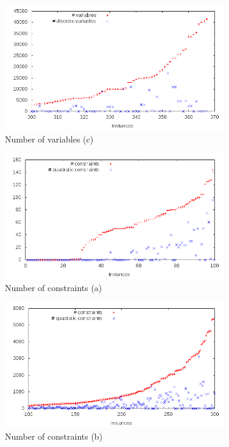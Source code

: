 \begin{enumerate}
\begin{figure}\centering
  \includegraphics[width=0.85\textwidth]{pic_var_big.png}
  \caption{Number of variables (c) \label{fig:pic_var_large}}
\end{figure}

\begin{figure}\centering
  \includegraphics[width=0.85\textwidth]{pic_constr_small.png}
  \caption{Number of constraints (a) \label{fig:pic_constr_small}}
\end{figure}

\begin{figure}\centering
  \includegraphics[width=0.85\textwidth]{pic_constr_medium.png}
  \caption{Number of constraints (b) \label{fig:pic_constr_medium}}
\end{figure}


\end{enumerate}

